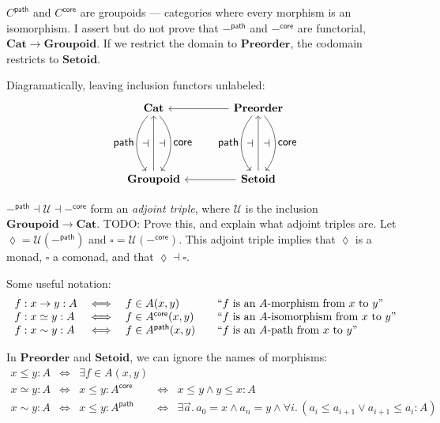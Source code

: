 \documentclass{article}
\newcommand{\todo}[1]{{\color{red}#1}}
\newcommand{\ms}[1]{\ensuremath{\mathsf{#1}}}
\newcommand{\mb}[1]{\ensuremath{\mathbf{#1}}}
\newcommand{\mc}[1]{\ensuremath{\mathcal{#1}}}
\newcommand{\binder}{.\,}
\newcommand{\bind}[1]{{#1}\binder}
\newcommand{\iso}{\ms{core}}
\renewcommand{\path}{\ms{path}}
\newcommand{\isoto}{\simeq}
\newcommand{\pathto}{\sim}
\begin{document}
$C^\path$ and $C^\iso$ are groupoids --- categories where every morphism is an
isomorphism. I assert but do not prove that $-^\path$ and $-^\iso$ are
functorial, $\mb{Cat} \to \mb{Groupoid}$. If we restrict the domain to
$\mb{Preorder}$, the codomain restricts to $\mb{Setoid}$.

Diagramatically, leaving inclusion functors unlabeled:
{\large\[
  \tikzset{
    no line/.style={draw=none,
      commutative diagrams/every label/.append style={/tikz/auto=false}}}
  \begin{tikzcd}[row sep=5em,column sep=4em]
    \mb{Cat}
    \arrow[d,bend right=40,"\textstyle\path"'{name=A}]
    \arrow[d,bend left=40,"\textstyle\iso"{name=C}]
    & \mb{Preorder}
    \arrow[d,bend right=40,"\textstyle\path"'{name=A2}]
    \arrow[d,bend left=40,"\textstyle\iso"{name=C2}]
    \arrow[l]
    \\
    \mb{Groupoid} \arrow[u,""{name=B}]
    & \mb{Setoid} \arrow{u}[name=B2]{} \arrow[l]
    \arrow[to path={(A) -- (B)\tikztonodes}, no line, near end]{}{\displaystyle\dashv}
    \arrow[to path={(B) -- (C)\tikztonodes}, no line]{}{\displaystyle\dashv}
    \arrow[to path={(A2) -- (B2)\tikztonodes}, no line, near end]{}{\displaystyle\dashv}
    \arrow[to path={(B2) -- (C2)\tikztonodes}, no line]{}{\displaystyle\dashv}
  \end{tikzcd}
\]}

$-^\path \dashv \mc{U} \dashv -^\iso$ form an \emph{adjoint triple}, where
$\mc{U}$ is the inclusion $\mb{Groupoid} \to \mb{Cat}$. \todo{TODO:
  Prove this, and explain what adjoint triples are.}
%
Let $\lozenge = \mc{U}(-^\path)$ and $\square = \mc{U}(-^\iso)$. This adjoint
triple implies that $\lozenge$ is a monad, $\square$ a comonad, and that
$\lozenge \dashv \square$.

Some useful notation:
\[\begin{array}{lcl@{\hskip 2em}l}
  f : x \to y : A &\iff& f \in A(x,y)
  & \text{``$f$ is an $A$-morphism from $x$ to $y$''}\\
  f : x \simeq y : A &\iff& f \in A^\iso(x,y)
  & \text{``$f$ is an $A$-isomorphism from $x$ to $y$''}\\
  f : x \pathto y : A &\iff& f \in A^\path(x,y)
  & \text{``$f$ is an $A$-path from $x$ to $y$''}
\end{array}\]

In $\mb{Preorder}$ and $\mb{Setoid}$, we can ignore the names of morphisms:
\[\begin{array}{lclcl}
  x \le y : A &\iff& \exists f \in A(x,y)\\
  x \isoto y : A &\iff& x \le y : A^\iso &\iff& x \le y \wedge y \le x : A\\
  x \pathto y : A &\iff& x \le y : A^\path
  &\iff& \exists\bind{\vec{a}} a_0 = x \wedge a_n = y
  \wedge \forall\bind{i} (a_i \le a_{i+1} \vee a_{i+1} \le a_i : A)
\end{array}\]
\end{document}
